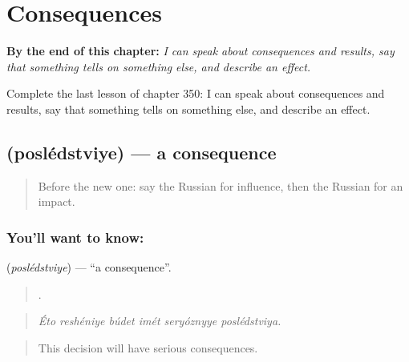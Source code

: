 
\chapter{Consequences}
\label{ch:ru-consequences}

\begin{chapteropening}
\textbf{By the end of this chapter:} \emph{I can speak about consequences and results, say that something tells on something else, and describe an effect.}

Complete the last lesson of chapter 350: I can speak about consequences and results, say that something tells on something else, and describe an effect.
\end{chapteropening}

\section[\texorpdfstring{\ru{последствие} (poslédstviye)}{последствие (poslédstviye)}]{ (poslédstviye) — a consequence}

\label{lesson:RU-C350-posledstvie}



\begin{quote}
Before the new one: say the Russian for influence, then the Russian for an impact.
\end{quote}

\subsection*{You'll want to know: }
\textbf{} (\emph{poslédstviye}) — \textquotedblleft{}a consequence\textquotedblright{}.

\begin{quote}
     .
\end{quote}

\begin{quote}
\emph{Éto reshéniye búdet imét seryóznyye poslédstviya.}
\end{quote}

\begin{quote}
This decision will have serious consequences.
\end{quote}

